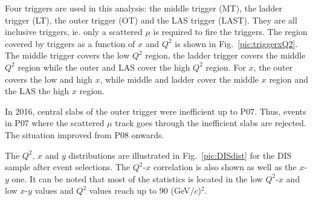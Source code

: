 Four triggers are used in this analysis: the middle trigger (MT), the ladder trigger (LT), the outer trigger (OT) and the LAS trigger (LAST). They are all inclusive triggers, ie. only a scattered $\mu$ is required to fire the triggers. The region covered by triggers as a function of $x$ and $Q^2$ is shown in Fig.~\ref{pic:triggerxQ2}. The middle trigger covers the low $Q^2$ region, the ladder trigger covers the middle $Q^2$ region while the outer and LAS cover the high $Q^2$ region. For $x$, the outer covers the low and high $x$, while middle and ladder cover the middle $x$ region and the LAS the high $x$ region.

In 2016, central slabs of the outer trigger were inefficient up to P$07$. Thus, events in P$07$ where the scattered $\mu$ track goes through the inefficient slabs are rejected. The situation improved from P$08$ onwards.

The $Q^2$, $x$ and $y$ distributions are illustrated in Fig.~\ref{pic:DISdist} for the DIS sample after event selections. The $Q^2$-$x$ correlation is also shown as well as the $x$-$y$ one. It can be noted that most of the statistics is located in the low $Q^2$-$x$ and low $x$-$y$ values and $Q^2$ values reach up to 90 (GeV/$c$)$^2$.

